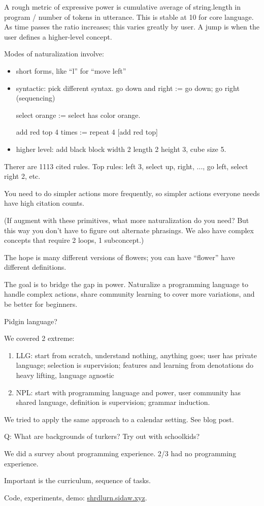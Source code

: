 A rough metric of expressive power is cumulative average of string.length in program / number of tokens in utterance. 
This is stable at 10 for core language. As time passes the ratio increases; this varies greatly by user. A jump is when the user defines a higher-level concept.

Modes of naturalization involve:
\begin{itemize}
\item
short forms, like ``l'' for ``move left''
\item
syntactic: pick different syntax. go down and right := go down; go right (sequencing)

select orange := select has color orange.

add red top 4 times := repeat 4 [add red top]
\item
higher level: add black block width 2 length 2 height 3, cube size 5.
\end{itemize}
Therer are 1113 cited rules. Top rules: left 3, select up, right, ..., go left, select right 2, etc.


You need to do simpler actions more frequently, so simpler actions everyone needs have high citation counts. 

(If augment with these primitives, what more naturalization do you need? But this way you don't have to figure out alternate phrasings. We also have complex concepts that require 2 loops, 1 subconcept.)


The hope is many different versions of flowers; you can have ``flower'' have different definitions.

The goal is to bridge the gap in power. Naturalize a programming language to handle complex actions, share community learning to cover more variations, and be  better for beginners.

Pidgin language?

We covered 2 extreme:
\begin{enumerate}
\item
LLG: start from scratch, understand nothing, anything goes; user has private language; selection is supervision; features and learning from denotations do heavy lifting, language agnostic
\item
NPL: start with programming language and power, user community has shared language, definition is supervision; grammar induction.
\end{enumerate}

We tried to apply the same approach to a calendar setting. See blog post.

Q: 
What
are backgrounds of turkers? Try out with schoolkids?

We did a survey about programming experience. 2/3 had no programming experience. 

Important is the curriculum, sequence of tasks. 

Code, experiments, demo: \url{shrdlurn.sidaw.xyz}.